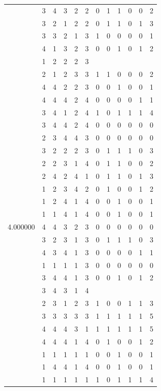 \documentclass[]{book}
\theoremstyle{definition}
\theoremstyle{definition}
\theoremstyle{definition}
\theoremstyle{remark}
\begin{document}
\begin{table}
{\begin{tabular}[t]{rrrrrrrrrrrr}
 & 3 & 4 & 3 & 2 & 2 & 0 & 1 & 1 & 0 & 0 & 2\\
 & 3 & 2 & 1 & 2 & 2 & 0 & 1 & 1 & 0 & 1 & 3\\
 & 3 & 3 & 2 & 1 & 3 & 1 & 0 & 0 & 0 & 0 & 1\\
 & 4 & 1 & 3 & 2 & 3 & 0 & 0 & 1 & 0 & 1 & 2\\
 & 1 & 2 & 2 & 2 & 3 &  &  &  &  &  & \\
 & 2 & 1 & 2 & 3 & 3 & 1 & 1 & 0 & 0 & 0 & 2\\
 & 4 & 4 & 2 & 2 & 3 & 0 & 0 & 1 & 0 & 0 & 1\\
 & 4 & 4 & 4 & 2 & 4 & 0 & 0 & 0 & 0 & 1 & 1\\
 & 3 & 4 & 1 & 2 & 4 & 1 & 0 & 1 & 1 & 1 & 4\\
 & 3 & 4 & 4 & 2 & 4 & 0 & 0 & 0 & 0 & 0 & 0\\
 & 2 & 3 & 4 & 4 & 3 & 0 & 0 & 0 & 0 & 0 & 0\\
 & 3 & 2 & 2 & 2 & 3 & 0 & 1 & 1 & 1 & 0 & 3\\
 & 2 & 2 & 3 & 1 & 4 & 0 & 1 & 1 & 0 & 0 & 2\\
 & 2 & 4 & 2 & 4 & 1 & 0 & 1 & 1 & 0 & 1 & 3\\
 & 1 & 2 & 3 & 4 & 2 & 0 & 1 & 0 & 0 & 1 & 2\\
 & 1 & 2 & 4 & 1 & 4 & 0 & 0 & 1 & 0 & 0 & 1\\
 & 1 & 1 & 4 & 1 & 4 & 0 & 0 & 1 & 0 & 0 & 1\\
4.000000 & 4 & 4 & 3 & 2 & 3 & 0 & 0 & 0 & 0 & 0 & 0\\
 & 3 & 2 & 3 & 1 & 3 & 0 & 1 & 1 & 1 & 0 & 3\\
 & 4 & 3 & 4 & 1 & 3 & 0 & 0 & 0 & 0 & 1 & 1\\
 & 1 & 1 & 1 & 1 & 3 & 0 & 0 & 0 & 0 & 0 & 0\\
 & 3 & 4 & 4 & 1 & 3 & 0 & 0 & 1 & 0 & 1 & 2\\
 & 3 & 4 & 3 & 1 & 4 &  &  &  &  &  & \\
 & 2 & 3 & 1 & 2 & 3 & 1 & 0 & 0 & 1 & 1 & 3\\
 & 3 & 3 & 3 & 3 & 3 & 1 & 1 & 1 & 1 & 1 & 5\\
 & 4 & 4 & 4 & 3 & 1 & 1 & 1 & 1 & 1 & 1 & 5\\
 & 4 & 4 & 4 & 1 & 4 & 0 & 1 & 0 & 0 & 1 & 2\\
 & 1 & 1 & 1 & 1 & 1 & 0 & 0 & 1 & 0 & 0 & 1\\
 & 1 & 4 & 4 & 1 & 4 & 0 & 0 & 1 & 0 & 0 & 1\\
 & 1 & 1 & 1 & 1 & 1 & 1 & 0 & 1 & 1 & 1 & 4\\

\end{tabular}}
\end{table}
\end{document}
